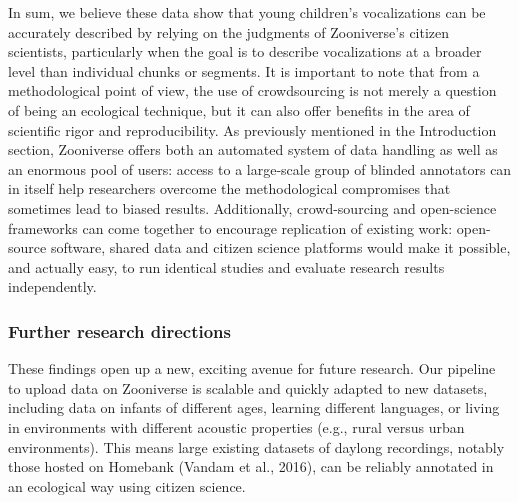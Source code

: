 \documentclass[
  english,
  ,man]{apa6}
\begin{document}
In sum, we believe these data show that young children's vocalizations can be accurately described by relying on the judgments of Zooniverse's citizen scientists, particularly when the goal is to describe vocalizations at a broader level than individual chunks or segments. It is important to note that from a methodological point of view, the use of crowdsourcing is not merely a question of being an ecological technique, but it can also offer benefits in the area of scientific rigor and reproducibility. As previously mentioned in the Introduction section, Zooniverse offers both an automated system of data handling as well as an enormous pool of users: access to a large-scale group of blinded annotators can in itself help researchers overcome the methodological compromises that sometimes lead to biased results. Additionally, crowd-sourcing and open-science frameworks can come together to encourage replication of existing work: open-source software, shared data and citizen science platforms would make it possible, and actually easy, to run identical studies and evaluate research results independently.

\hypertarget{further-research-directions}{%
\subsubsection{Further research directions}\label{further-research-directions}}

These findings open up a new, exciting avenue for future research. Our pipeline to upload data on Zooniverse is scalable and quickly adapted to new datasets, including data on infants of different ages, learning different languages, or living in environments with different acoustic properties (e.g., rural versus urban environments). This means large existing datasets of daylong recordings, notably those hosted on Homebank (Vandam et al., 2016), can be reliably annotated in an ecological way using citizen science.
\end{document}
